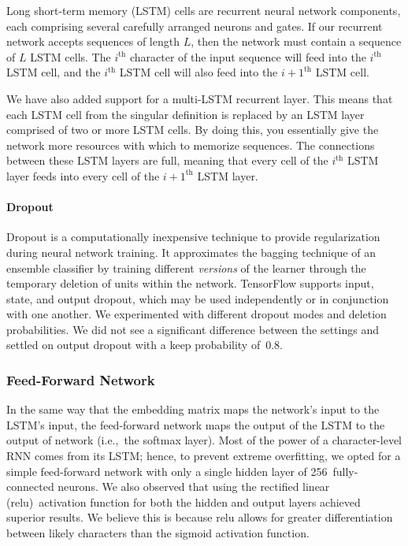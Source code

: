 \documentclass{article}
\begin{document}
Long short-term memory (LSTM) cells are recurrent neural network components, each comprising several carefully arranged neurons and gates. If our recurrent network accepts sequences of length $L$, then the network must contain a sequence of $L$ LSTM cells. The $i^{\text{th}}$ character of the input sequence will feed into the $i^{\text{th}}$ LSTM cell, and the $i^{\text{th}}$ LSTM cell will also feed into the $i+1^{\text{th}}$ LSTM cell.

We have also added support for a multi-LSTM recurrent layer. This means that each LSTM cell from the singular definition is replaced by an LSTM layer comprised of two or more LSTM cells. By doing this, you essentially give the network more resources with which to memorize sequences. The connections between these LSTM layers are full, meaning that every cell of the $i^{\text{th}}$ LSTM layer feeds into every cell of the $i+1^{\text{th}}$ LSTM layer.

\paragraph{Dropout}\label{sec:dropout}

Dropout is a computationally inexpensive technique to provide regularization during neural network training.  It approximates the bagging technique of an ensemble classifier by training different \textit{versions} of the learner through the temporary deletion of units within the network.\cite{goodfellow2016}  TensorFlow supports input, state, and output dropout, which may be used independently or in conjunction with one another.  We experimented with different dropout modes and deletion probabilities.  We did not see a significant difference between the settings and settled on output dropout with a keep probability of~0.8.

\subsubsection{Feed-Forward Network}

In the same way that the embedding matrix maps the network's input to the LSTM's input, the feed-forward network maps the output of the LSTM to the output of network (i.e.,~the softmax layer).  Most of the power of a character-level RNN comes from its LSTM; hence, to prevent extreme overfitting, we opted for a simple feed-forward network with only a single hidden layer of 256~fully-connected neurons.   We also observed that using the rectified linear (relu)~activation function for both the hidden and output layers achieved superior results.  We believe this is because relu allows for greater differentiation between likely characters than the sigmoid activation function.
\end{document}
